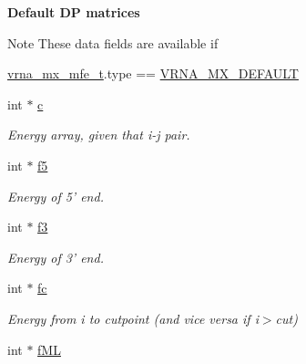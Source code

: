 \begin{Indent}{\bf Default D\-P matrices}\par
{\em \begin{DoxyNote}{Note}
These data fields are available if 
\begin{DoxyCode}
\hyperlink{group__dp__matrices_structvrna__mx__mfe__s}{vrna\_mx\_mfe\_t}.type == \hyperlink{group__dp__matrices_gga6042ea1d58d01931e959791be6d89343aafa2568956dab79595521e20c49a5f75}{VRNA\_MX\_DEFAULT} 
\end{DoxyCode}
 
\end{DoxyNote}
}\begin{DoxyCompactItemize}
\item 
\hypertarget{group__dp__matrices_a60a511fd42905ee4f046c56a76865bf9}{int $\ast$ \hyperlink{group__dp__matrices_a60a511fd42905ee4f046c56a76865bf9}{c}}\label{group__dp__matrices_a60a511fd42905ee4f046c56a76865bf9}

\begin{DoxyCompactList}\small\item\em Energy array, given that i-\/j pair. \end{DoxyCompactList}\item 
\hypertarget{group__dp__matrices_abebad693be987c2701d64477ab858039}{int $\ast$ \hyperlink{group__dp__matrices_abebad693be987c2701d64477ab858039}{f5}}\label{group__dp__matrices_abebad693be987c2701d64477ab858039}

\begin{DoxyCompactList}\small\item\em Energy of 5' end. \end{DoxyCompactList}\item 
\hypertarget{group__dp__matrices_a4ea4595a93733adef047ece8e6f5da52}{int $\ast$ \hyperlink{group__dp__matrices_a4ea4595a93733adef047ece8e6f5da52}{f3}}\label{group__dp__matrices_a4ea4595a93733adef047ece8e6f5da52}

\begin{DoxyCompactList}\small\item\em Energy of 3' end. \end{DoxyCompactList}\item 
\hypertarget{group__dp__matrices_a8ee6b6cefe20cfbf1f6bef5c788b6667}{int $\ast$ \hyperlink{group__dp__matrices_a8ee6b6cefe20cfbf1f6bef5c788b6667}{fc}}\label{group__dp__matrices_a8ee6b6cefe20cfbf1f6bef5c788b6667}

\begin{DoxyCompactList}\small\item\em Energy from i to cutpoint (and vice versa if i$>$cut) \end{DoxyCompactList}\item 
\hypertarget{group__dp__matrices_a103995e4ab8e21e7f8bc36a6edcb1331}{int $\ast$ \hyperlink{group__dp__matrices_a103995e4ab8e21e7f8bc36a6edcb1331}{f\-M\-L}}\label{group__dp__matrices_a103995e4ab8e21e7f8bc36a6edcb1331}


\end{DoxyCompactItemize}
\end{Indent}
